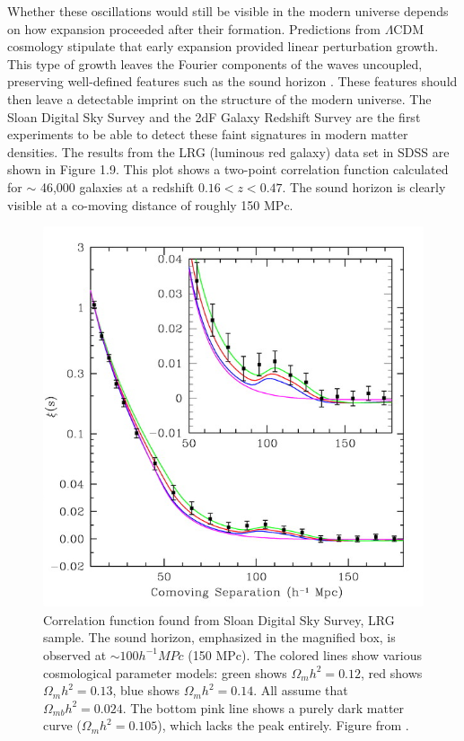 \documentclass{report}
\begin{document}
Whether these oscillations would still be visible in the modern universe depends on how expansion proceeded after their formation. Predictions from $\Lambda$CDM cosmology stipulate that early expansion provided linear perturbation growth. This type of growth leaves the Fourier components of the waves uncoupled, preserving well-defined features such as the sound horizon \cite{Eisenstein2005}. These features should then leave a detectable imprint on the structure of the modern universe. The Sloan Digital Sky Survey and the 2dF Galaxy Redshift Survey are the first experiments to be able to detect these faint signatures in modern matter densities. The results from the LRG (luminous red galaxy) data set in SDSS are shown in Figure 1.9. This plot shows a two-point correlation function calculated for $\sim$ 46,000 galaxies at a redshift $0.16 < z < 0.47$. The sound horizon is clearly visible at a co-moving distance of roughly 150 MPc.

\begin{figure}[h]
\centering
\includegraphics[width = .5\textwidth]{BAO_peak.jpg}
\caption{Correlation function found from Sloan Digital Sky Survey, LRG sample. The sound horizon, emphasized in the magnified box, is observed at $\sim 100 h^{-1} MPc$ (150 MPc). The colored lines show various cosmological parameter models: green shows $\Omega_{m}h^2 = 0.12$, red shows $\Omega_{m}h^2 = 0.13$, blue shows $\Omega_{m}h^2 = 0.14$. All assume that $\Omega_{mb}h^2 = 0.024$. The bottom pink line shows a purely dark matter curve ($\Omega_{m}h^2 = 0.105$), which lacks the peak entirely. Figure from \cite{Eisenstein2005}.}
\end{figure}
\end{document}
